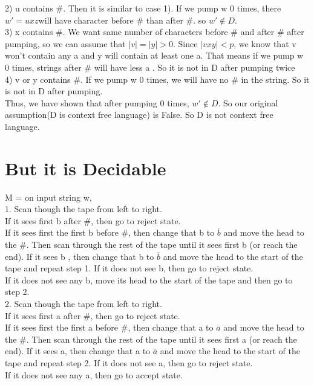 \documentclass[12pt]{article}
\begin{document}
2) u contains $\#$. Then it is similar to case 1). If we pump w 0 times, there $w' = uxz$will have character before $\#$ than after $\#$. so $w' \notin D$.\\

3) x contains $\#$. We want same number of characters before $\#$ and after $\#$ after pumping, so we can assume that $|v| = |y| > 0$.
Since $|vxy| < p$, we know that v won't contain any a and y will contain at least one a. That means if we pump w 0 times, strings after $\#$ will have less a . So it is not in D after pumping twice\\

4) v or y contains $\#$. If we pump w 0 times, we will have no $\#$ in the string. So it is not in D after pumping.\\

Thus, we have shown that after pumping 0 times, $w' \notin D$. So our original assumption(D is context free language) is False. So D is not context free language.\\




\pagebreak
\section{But it is Decidable}
M = on input string w,\\

1. Scan though the tape from left to right. \\
\phantom{1234} If it sees first b after $\#$, then go to reject state.\\
\phantom{1234} If it sees first the first b before $\#$, then change that b to $\overline{b}$ and move the head to the $\#$. Then scan through the rest of the tape until it sees first b (or reach the end). If it sees b , then change that b to $\overline{b}$ and move the head to the start of the tape and repeat step 1. If it does not see b, then go to reject state.\\
\phantom{1234} If it does not see any b, move its head to the start of the tape and then go to step 2. \\

2.   Scan though the tape from left to right. \\
\phantom{1234} If it sees first a after $\#$, then go to reject state.\\
\phantom{1234} If it sees first the first a before $\#$, then change that a to $\overline{a}$ and move the head to the $\#$. Then scan through the rest of the tape until it sees first a (or reach the end). If it sees a, then change that a to $\overline{a}$ and move the head to the start of the tape and repeat step 2. If it does not see a, then go to reject state.\\
\phantom{1234} If it does not see any a, then go to accept state. \\
\end{document}
